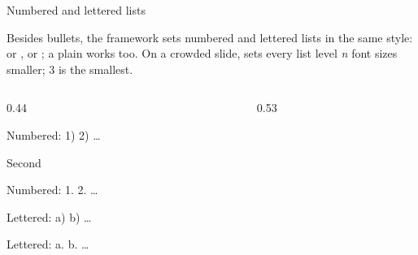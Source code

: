 
\begin{standardframe}{Numbered and lettered lists}
	{\small\SMLineTop Besides bullets, the framework sets numbered and lettered lists in the same style:
	 or ,  or ; a plain  works too.
	On a crowded slide,  sets every list level \emph{n} font sizes
	smaller; 3 is the smallest.\par}
	\vspace{-3.5pt}
	\begin{columns}[T,onlytextwidth]
		\begin{column}{0.44\linewidth}
			\begin{SMNumItemize}
				\item Numbered: 1) 2) \ldots
				\item Second
			\end{SMNumItemize}
			\begin{SMNumPeriodItemize}
				\item Numbered: 1. 2. \ldots
			\end{SMNumPeriodItemize}
			\begin{SMAlphaItemize}
				\item Lettered: a) b) \ldots
			\end{SMAlphaItemize}
			\begin{SMAlphaPeriodItemize}
				\item Lettered: a. b. \ldots
			\end{SMAlphaPeriodItemize}
		\end{column}
		\begin{column}{0.53\linewidth}
		\end{column}
	\end{columns}
\end{standardframe}
